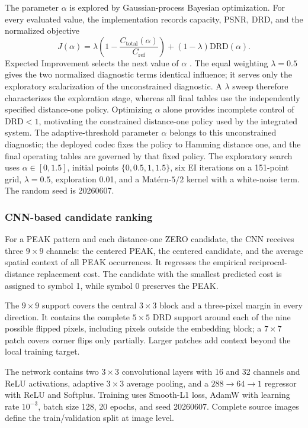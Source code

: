 \documentclass[a4paper,fleqn]{cas-dc}
\begin{document}
The parameter $\alpha$ is explored by Gaussian-process Bayesian optimization.
For every evaluated value, the implementation records capacity, PSNR, DRD, and
the normalized objective
\begin{equation}
J(\alpha)=\lambda\left(1-\frac{C_{\text{total}}(\alpha)}{C_{\mathrm{ref}}}\right)
+(1-\lambda)\mathrm{DRD}(\alpha).
\label{eq:gp-objective}
\end{equation}
Expected Improvement selects the next value of $\alpha$
\cite{Frazier2018Bayesian}. The equal weighting
$\lambda=0.5$ gives the two normalized diagnostic terms identical influence;
it serves only the exploratory scalarization of the unconstrained diagnostic.
A $\lambda$ sweep therefore characterizes the exploration stage, whereas all
final tables use the independently specified distance-one policy. Optimizing
$\alpha$ alone provides incomplete control of
$\mathrm{DRD}<1$, motivating the constrained distance-one policy used by the
integrated system. The adaptive-threshold parameter $\alpha$ belongs to this
unconstrained diagnostic; the deployed codec fixes the policy to Hamming
distance one, and the final operating tables are governed by that fixed policy.
The exploratory search uses
$\alpha\in[0,1.5]$, initial points $\{0,0.5,1,1.5\}$, six EI iterations on a
151-point grid, $\lambda=0.5$, exploration 0.01, and a Mat\'ern-$5/2$ kernel
with a white-noise term. The random seed is 20260607.

\subsubsection*{CNN-based candidate ranking}

For a PEAK pattern and each distance-one ZERO candidate, the CNN receives three
$9\times9$ channels: the centered PEAK, the centered candidate, and the average
spatial context of all PEAK occurrences. It regresses the empirical
reciprocal-distance replacement cost. The candidate with the smallest predicted
cost is assigned to symbol 1, while symbol 0 preserves the PEAK.

The $9\times9$ support covers the central $3\times3$ block and a three-pixel
margin in every direction. It contains the complete $5\times5$ DRD support
around each of the nine possible flipped pixels, including pixels outside the
embedding block; a $7\times7$ patch covers corner flips only partially.
Larger patches add context beyond the local training target.

The network contains two $3\times3$ convolutional layers with 16 and 32
channels and ReLU activations, adaptive $3\times3$ average pooling, and a
$288\rightarrow64\rightarrow1$ regressor with ReLU and Softplus. Training uses
Smooth-L1 loss, AdamW with learning rate $10^{-3}$, batch size 128, 20 epochs,
and seed 20260607. Complete source images define the train/validation split at
image level.
\end{document}
